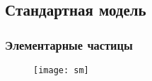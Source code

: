 \subsection{Стандартная модель}
\begin{frame}
    \frametitle{Элементарные частицы}
    \begin{figure}
    \texttt{[image: sm]}
    \end{figure}
\end{frame}
